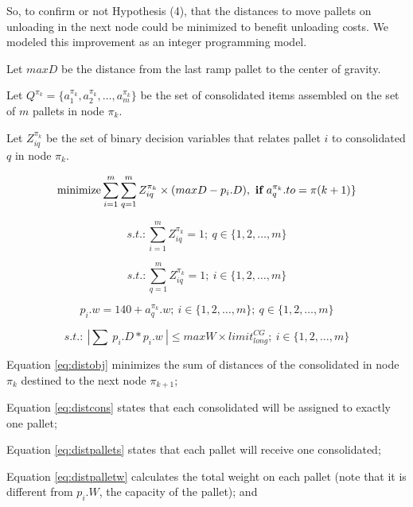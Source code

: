 \documentclass[preprint,authoryear]{elsarticle}
\begin{document}
So, to confirm or not Hypothesis (4), that the distances to move pallets on unloading in the next node could be minimized to benefit unloading costs. We modeled this improvement as an integer programming model.

Let $maxD$ be the distance from the last ramp pallet to the center of gravity.

Let $Q^{\pi_k}  = \{ a^{\pi_k}_1, a^{\pi_k}_2, \ldots, a^{\pi_k}_m \}$ be the set of consolidated items assembled on the set of $m$ pallets in node $\pi_k$.

Let $Z^{\pi_k}_{iq}$ be the set of binary decision variables that relates pallet $i$ to consolidated $q$ in node $\pi_k$.

\begin{equation} \label{eq:distobj}
	\mbox{minimize} \sum_{i=1}^m \sum_{q=1}^m Z^{\pi_k}_{iq} \times ( maxD - p_i.D) ,\ \mbox{{\bf if}}\ a^{\pi_k}_q.to = \pi(k+1) \}
\end{equation}

\begin{equation} \label{eq:distcons}
	s.t.: \sum_{i=1}^m Z^{\pi_k}_{iq} = 1;\ q \in \{1,2,\ldots,m\}
\end{equation}

\begin{equation} \label{eq:distpallets}
	s.t.: \sum_{q=1}^{m} Z^{\pi_k}_{iq}=1;\ i \in \{1,2,\ldots,m\}
\end{equation}

\begin{equation} \label{eq:distpalletw}
	p_i.w = 140 + a^{\pi_k}_q.w ;\ i \in \{1,2,\ldots,m\};\ q \in \{1,2,\ldots,m\}
\end{equation}

\begin{equation} \label{eq:disttorque}
	s.t.:\ | \sum\ p_i.D * p_i.w\ | \leq maxW \times limit^{CG}_{long} ;\ i \in \{1,2,\ldots,m\}
\end{equation}

Equation \ref{eq:distobj} minimizes the sum of distances of the consolidated in node $\pi_k$ destined to the next node $\pi_{k+1}$;

Equation \ref{eq:distcons} states that each consolidated will be assigned to exactly one pallet;

Equation \ref{eq:distpallets} states that each pallet will receive one consolidated;

Equation \ref{eq:distpalletw} calculates the total weight on each pallet (note that it is different from $p_i.W$, the capacity of the pallet); and
\end{document}
